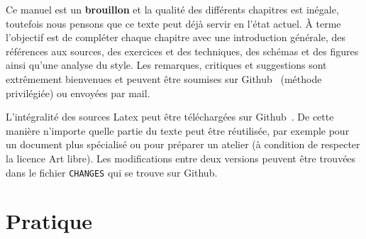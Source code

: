 Ce manuel est un \textbf{brouillon} et la qualité des différents chapitres est inégale, toutefois nous pensons que ce texte peut déjà servir en l'état actuel.
À terme l'objectif est de compléter chaque chapitre avec une introduction générale, des références aux sources, des exercices et des techniques, des schémas et des figures ainsi qu'une analyse du style.
Les remarques, critiques et suggestions sont extrêmement bienvenues et peuvent être soumises sur Github~\footnotemark{} (méthode privilégiée) ou envoyées par mail.

L'intégralité des sources Latex peut être téléchargées sur Github~\footnotemark{}.
De cette manière n'importe quelle partie du texte peut être réutilisée, par exemple pour un document plus spécialisé ou pour préparer un atelier (à condition de respecter la licence Art libre).
Les modifications entre deux versions peuvent être trouvées dans le fichier \texttt{CHANGES} qui se trouve sur Github.





\section{Pratique}


